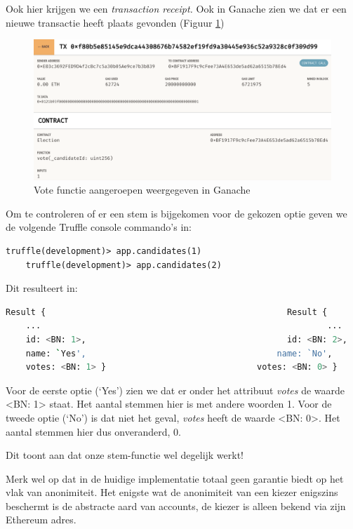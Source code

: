 	Ook hier krijgen we een \textit{transaction receipt.} Ook in Ganache zien we dat er een  nieuwe transactie heeft plaats gevonden (Figuur \ref{fig:contracts-ganache3})
	\begin{figure}
		\includegraphics[width=\linewidth]{img/contracts-ganache3.png}
		\caption{Vote functie aangeroepen weergegeven in Ganache}
		\label{fig:contracts-ganache3}
	\end{figure}
	Om te controleren of er een stem is bijgekomen voor de gekozen optie geven we de volgende Truffle console commando's in:
	\begin{lstlisting}[numbers=none]
	truffle(development)> app.candidates(1)
	truffle(development)> app.candidates(2)
	\end{lstlisting}
	
	Dit resulteert in:
	\begin{lstlisting}[numbers=none,language=bash]
	Result {												Result {
	...															...
	id: <BN: 1>,										id: <BN: 2>,
	name: `Yes',									  name: `No',
	votes: <BN: 1> }							  votes: <BN: 0> }
	\end{lstlisting}
	
	Voor de eerste optie (`Yes') zien we dat er onder het attribuut \textit{votes} de waarde <BN: 1> staat. Het aantal stemmen hier is met andere woorden 1.
	Voor de tweede optie (`No') is dat niet het geval, \textit{votes} heeft de  waarde <BN: 0>. Het aantal stemmen hier dus onveranderd, 0.
	
	Dit toont aan dat onze stem-functie wel degelijk werkt!
	
	Merk wel op dat in de huidige implementatie totaal geen garantie biedt op het vlak van anonimiteit. Het enigste wat de anonimiteit van een kiezer enigszins beschermt is de abstracte aard van accounts, de kiezer is alleen bekend via zijn Ethereum adres. 
	
